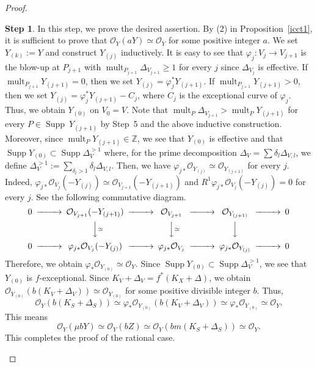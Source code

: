 \documentclass[12pt,twoside]{amsart}
\newcommand{\Supp}[0]{{\operatorname{Supp}}}
\newcommand{\mult}[0]{{\operatorname{mult}}}
\theoremstyle{definition}
\newtheorem{step}{Step}
\begin{document}
\begin{proof}
\begin{step}
In this step, we prove the desired assertion. 
By (2) in Proposition~\ref{icct1}, it is sufficient to prove that 
$\mathcal O_{Y}(a{Y})\simeq \mathcal O_{Y}$ for 
some positive integer $a$. 
We set $Y_{(k)}:=Y$ and construct $Y_{(j)}$ inductively. 
It is easy to see that 
$\varphi_j:V_j\to V_{j+1}$ is the blow-up at $P_{j+1}$ with 
$\mult _{P_{j+1}}\Delta_{V_{j+1}}\geq 1$ 
for every $j$ since $\Delta_{V_j}$ is effective. 
If $\mult _{P_{j+1}}Y_{(j+1)}=0$, 
then we set $Y_{(j)}=\varphi^*_{j}Y_{(j+1)}$. 
If $\mult _{P_{j+1}}Y_{(j+1)}>0$, 
then we set $Y_{(j)}=\varphi^*_{j}Y_{(j+1)}-C_j$, where 
$C_j$ is the exceptional curve of $\varphi_j$. 
Thus, we obtain $Y_{(0)}$ on $V_0=V$. 
Note that $\mult _P\Delta_{V_{j+1}}>\mult _PY_{(j+1)}$ for 
every $P\in \Supp~Y_{(j+1)}$ by Step~5 and 
the above inductive construction. 
Moreover, since $\mult _PY_{(j+1)}\in \mathbb Z$, 
we see that $Y_{(0)}$ is effective and that 
$\Supp Y_{(0)}\subset \Supp \Delta^{>1}_V$ 
where, for the prime decomposition 
$\Delta_V=\sum \delta_l\Delta_{V,l}$, 
we define $\Delta^{>1}_V:=\sum_{\delta_l>1} \delta_l\Delta_{V,l}.$ 
Then, we have 
$\varphi_{j*}\mathcal O_{Y_{(j)}}\simeq \mathcal O_{Y_{(j+1)}}$ 
for every $j$. 
Indeed, $\varphi_{j*}\mathcal O_{V_j}(-Y_{(j)})\simeq 
\mathcal O_{V_{j+1}}(-Y_{(j+1)})$ and 
$R^1\varphi_{j*}\mathcal O_{V_{j}}(-Y_{(j)})=0$ for every $j$. 
See the following commutative diagram. 
$$\begin{CD}
0@>>>
\mathcal O_{V_{j+1}}(-Y_{(j+1)})@>>>
\mathcal O_{V_{j+1}}@>>>
\mathcal O_{Y_{(j+1)}}@>>>0\\
@. @VV{\simeq }V @VV{\simeq }V @VVV \\
0@>>>
\varphi_{j*}\mathcal O_{V_j}(-Y_{(j)})@>>>
\varphi_{j*}\mathcal O_{V_{j}}@>>>
\varphi_{j*}\mathcal O_{Y_{(j)}}@>>>0
\end{CD}$$
Therefore, we obtain $\varphi_*\mathcal O_{Y_{(0)}}\simeq \mathcal O_Y$. 
Since $\Supp Y_{(0)}\subset \Supp \Delta^{>1}_V$, we see that 
$Y_{(0)}$ is $f$-exceptional. 
Since $K_V+\Delta_V=f^*(K_X+\Delta)$, 
we obtain 
$\mathcal O_{Y_{(0)}}(b(K_V+\Delta_V))\simeq 
\mathcal O_{Y_{(0)}}$ for 
some positive divisible integer $b$. 
Thus, 
$$\mathcal O_Y(b(K_S+\Delta_S))\simeq
\varphi_*\mathcal O_{Y_{(0)}}(b(K_V+\Delta_V)) \simeq 
\varphi_*\mathcal O_{Y_{(0)}} \simeq
\mathcal O_Y. $$ 
This means 
$$\mathcal O_Y(\mu bY)\simeq
\mathcal O_Y(bZ)\simeq
\mathcal O_Y(bm(K_S+\Delta_S))\simeq
\mathcal O_Y.$$
This completes the proof of the rational case. 
\end{step}


\end{proof}
\end{document}
